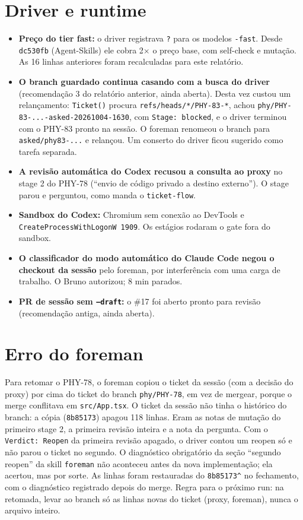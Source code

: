\documentclass[11pt,a4paper]{article}
\begin{document}
\section{Driver e runtime}
\begin{itemize}
  \item \textbf{Preço do tier fast:} o driver registrava \texttt{?} para os
        modelos \texttt{-fast}. Desde \texttt{dc530fb} (Agent-Skills) ele cobra
        2$\times$ o preço base, com self-check e mutação. As 16 linhas
        anteriores foram recalculadas para este relatório.
  \item \textbf{O branch guardado continua casando com a busca do driver}
        (recomendação 3 do relatório anterior, ainda aberta). Desta vez custou
        um relançamento: \texttt{Ticket()} procura \texttt{refs/heads/*/PHY-83-*},
        achou \texttt{phy/PHY-83-...-asked-20261004-1630}, com
        \texttt{Stage: blocked}, e o driver terminou com o PHY-83 pronto na
        sessão. O foreman renomeou o branch para \texttt{asked/phy83-...} e
        relançou. Um conserto do driver ficou sugerido como tarefa separada.
  \item \textbf{A revisão automática do Codex recusou a consulta ao proxy} no
        stage 2 do PHY-78 (``envio de código privado a destino externo''). O
        stage parou e perguntou, como manda o \texttt{ticket-flow}.
  \item \textbf{Sandbox do Codex:} Chromium sem conexão ao DevTools e
        \texttt{CreateProcessWithLogonW 1909}. Os estágios rodaram o gate fora
        do sandbox.
  \item \textbf{O classificador do modo automático do Claude Code negou o
        checkout da sessão} pelo foreman, por interferência com uma carga de
        trabalho. O Bruno autorizou; 8 min parados.
  \item \textbf{PR de sessão sem \texttt{--draft}:} o \#17 foi aberto pronto
        para revisão (recomendação antiga, ainda aberta).
\end{itemize}

\section{Erro do foreman}

Para retomar o PHY-78, o foreman copiou o ticket da sessão (com a decisão do
proxy) por cima do ticket do branch \texttt{phy/PHY-78}, em vez de mergear,
porque o merge conflitava em \texttt{src/App.tsx}. O ticket da sessão não tinha
o histórico do branch: a cópia (\texttt{8b85173}) apagou 118 linhas. Eram as
notas de mutação do primeiro stage 2, a primeira revisão inteira e a nota da
pergunta. Com o \texttt{Verdict: Reopen} da primeira revisão apagado, o driver
contou um reopen só e não parou o ticket no segundo. O diagnóstico obrigatório
da seção ``segundo reopen'' da skill \texttt{foreman} não aconteceu antes da
nova implementação; ela acertou, mas por sorte. As linhas foram restauradas do
\texttt{8b85173\^{}} no fechamento, com o diagnóstico registrado depois do merge.
Regra para o próximo run: na retomada, levar ao branch só as linhas novas do
ticket (proxy, foreman), nunca o arquivo inteiro.
\end{document}
